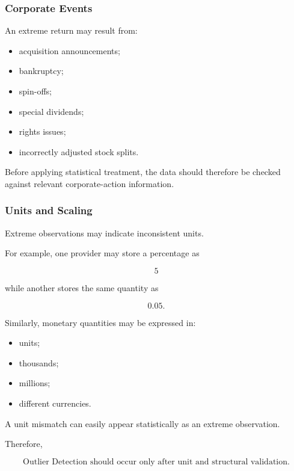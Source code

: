\documentclass[11pt,a4paper]{article}
\begin{document}
\subsubsection{Corporate Events}

An extreme return may result from:

\begin{itemize}
    \item acquisition announcements;
    \item bankruptcy;
    \item spin-offs;
    \item special dividends;
    \item rights issues;
    \item incorrectly adjusted stock splits.
\end{itemize}

Before applying statistical treatment, the data should therefore be checked
against relevant corporate-action information.


\subsubsection{Units and Scaling}

Extreme observations may indicate inconsistent units.

For example, one provider may store a percentage as

\begin{equation}
5
\end{equation}

while another stores the same quantity as

\begin{equation}
0.05.
\end{equation}

Similarly, monetary quantities may be expressed in:

\begin{itemize}
    \item units;
    \item thousands;
    \item millions;
    \item different currencies.
\end{itemize}

A unit mismatch can easily appear statistically as an extreme observation.

Therefore,

\begin{equation}
\boxed{
\text{Outlier Detection}
\text{ should occur only after }
\text{unit and structural validation}.
}
\end{equation}
\end{document}
